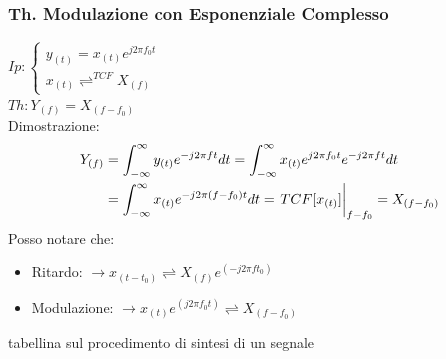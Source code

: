         \subsubsection{Th. Modulazione con Esponenziale Complesso}\label{Modulazione con Esponenziale Complesso}
            $Ip: \begin{cases}
                y_{(t)}= x_{(t)}e^{j2\pi f_0t}\\        
                x_{(t)}\rightleftharpoons^{TCF} X_{(f)}
                \end{cases}$\\
            $Th: Y_{(f)} = X_{(f-f_0)} $ \\
            Dimostrazione: 
            \begin{align}
                Y_{(f)} & = \int_{-\infty}^{\infty} y_{(t)} e^{-j2\pi ft} dt = \int_{-\infty}^{\infty} x_{(t)}e^{j2\pi f_0t} e^{-j2\pi ft} dt \nonumber \\
                & =\int_{-\infty}^{\infty} x_{(t)} e^{-j2\pi (f-f_0)t} dt = \eval{TCF[x_{(t)}]}_{f-f_0} = X_{(f-f_0)} \nonumber
            \end{align}
            Posso notare che:
            \begin{itemize}
                \item Ritardo: $\rightarrow x_{(t-t_0)} \rightleftharpoons X_{(f)} e^{(-j2\pi ft_0)}$
                \item Modulazione: $\rightarrow x_{(t)}e^{(j2\pi f_0t)} \rightleftharpoons X_{(f-f_0)}$
            \end{itemize}
    tabellina sul procedimento di sintesi di un segnale 